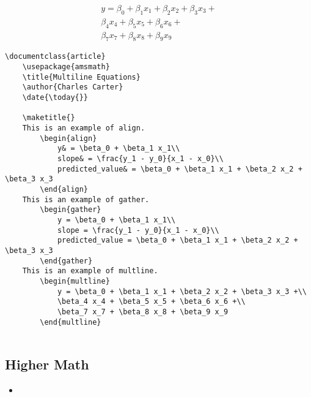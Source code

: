 		\begin{multline}
			y = \beta_0 + \beta_1 x_1 + \beta_2 x_2 + \beta_3 x_3 +\\
			\beta_4 x_4 + \beta_5 x_5 + \beta_6 x_6 +\\
			\beta_7 x_7 + \beta_8 x_8 + \beta_9 x_9
		\end{multline}
		
		\begin{verbatim}
\documentclass{article}
	\usepackage{amsmath}
    \title{Multiline Equations}
    \author{Charles Carter}
    \date{\today{}}
 
    \maketitle{}
	This is an example of align.
		\begin{align}
			y& = \beta_0 + \beta_1 x_1\\
			slope& = \frac{y_1 - y_0}{x_1 - x_0}\\
			predicted_value& = \beta_0 + \beta_1 x_1 + \beta_2 x_2 + \beta_3 x_3
		\end{align}
	This is an example of gather.
		\begin{gather}
			y = \beta_0 + \beta_1 x_1\\
			slope = \frac{y_1 - y_0}{x_1 - x_0}\\
			predicted_value = \beta_0 + \beta_1 x_1 + \beta_2 x_2 + \beta_3 x_3
		\end{gather}
	This is an example of multline.
		\begin{multline}
			y = \beta_0 + \beta_1 x_1 + \beta_2 x_2 + \beta_3 x_3 +\\
			\beta_4 x_4 + \beta_5 x_5 + \beta_6 x_6 +\\
			\beta_7 x_7 + \beta_8 x_8 + \beta_9 x_9
		\end{multline}
	    
        \end{verbatim}

        \subsection{Higher Math}
        \label{Higher Math}
        
        \begin{framed}
            \begin{itemize}
                \item{}
            \end{itemize}
        \end{framed}


